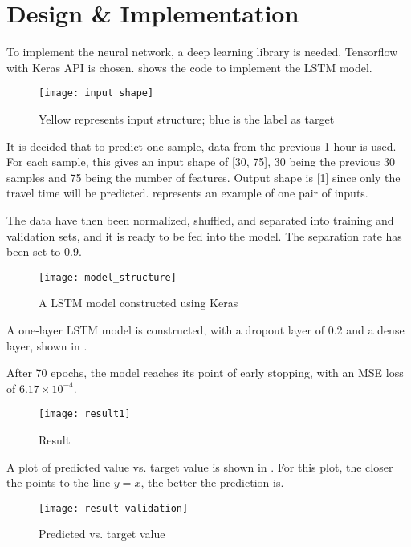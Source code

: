 \chapter{Design \& Implementation} \label{Chapter:DesignImplementation}

To implement the neural network, a deep learning library is needed. Tensorflow with Keras API is chosen. 
 shows the code to implement the LSTM model.

\begin{figure}[!htb]
    \centering
    \texttt{[image: input shape]}
    \caption{Yellow represents input structure; blue is the label as target}
    \label{Figure:input_shape}
\end{figure}

It is decided that to predict one sample, data from the previous 1 hour is used. For each sample, this gives an input shape of [30, 75], 30 being the previous 30 samples and 75 being the number of features.
Output shape is [1] since only the travel time will be predicted.  represents an example of one pair of inputs. 

The data have then been normalized, shuffled, and separated into training and validation sets, and it is ready to be fed into the model. The separation rate has been set to 0.9. 

\begin{figure}[!htb]
    \centering
    \texttt{[image: model\_structure]}
    \caption{A LSTM model constructed using Keras}
    \label{Figure:model_structure}
\end{figure}

A one-layer LSTM model is constructed, with a dropout layer of 0.2 and a dense layer, shown in .

After 70 epochs, the model reaches its point of early stopping, with an MSE loss of $6.17\times 10^{-4}$. 

\begin{figure}[!htb]
    \centering
    \texttt{[image: result1]}
    \caption{Result}
    \label{Figure:result1}
\end{figure}

A plot of predicted value vs. target value is shown in . For this plot, the closer the points to the line $y = x$, the better the prediction is. 

\begin{figure}[!htb]
    \centering
    \texttt{[image: result validation]}
    \caption{Predicted vs. target value}
    \label{Figure:result1_plot}
\end{figure}

